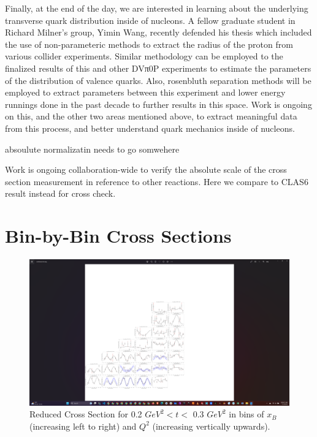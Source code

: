 Finally, at the end of the day, we are interested in learning about the underlying transverse quark distribution inside of
nucleons. A fellow graduate student in Richard Milner’s group, Yimin Wang, recently defended his thesis which included the
use of non-parameteric methods to extract the radius of the proton from various collider experiments. Similar methodology
can be employed to the finalized results of this and other DVπ0P experiments to estimate the parameters of the distribution
of valence quarks. Also, rosenbluth separation methods will be employed to extract parameters between this experiment and
lower energy runnings done in the past decade to further results in this space. Work is ongoing on this, and the other two areas
mentioned above, to extract meaningful data from this process, and better understand quark mechanics inside of nucleons.

absoulute normalizatin needs to go somwehere

Work is ongoing collaboration-wide to verify the absolute scale of the cross section measurement in reference to other reactions. Here we compare to CLAS6 result instead for cross check. 


\section{Bin-by-Bin Cross Sections}\label{sec:Ch5_raw_results}

\begin{figure}[ht]
\centering
\includegraphics[trim={14.6cm 4cm 27.2cm 4cm},clip,width=\textwidth]{Chapters/Ch4-BaseAnalysis/bin_by_bin_cross_sections/pics_screenshots/t_2.png}
\caption[Reduced Cross Section for 0.2 $GeV^2 < t <$ 0.3 $ GeV^2$]{Reduced Cross Section for 0.2 $ GeV^2 < t <$ 0.3 $GeV^2$ in bins of $x_B$ (increasing left to right) and $Q^2$ (increasing vertically upwards). }
\label{fig:combined_t0.2}
\end{figure}

